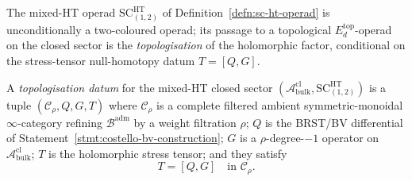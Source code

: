 The mixed-HT operad \(\mathrm{SC}^{\mathrm{HT}}_{(1,2)}\) of
Definition~\ref{defn:sc-ht-operad} is unconditionally a
two-coloured operad; its passage to a topological
\(E_d^{\mathrm{top}}\)-operad on the closed sector is the
\emph{topologisation} of the holomorphic factor, conditional on the
stress-tensor null-homotopy datum \(T=[Q,G]\).

\begin{defn}\label{defn:topologisation-datum}
A \emph{topologisation datum} for the mixed-HT closed sector
\((\mathcal A^{\mathrm{cl}}_{\mathrm{bulk}},
\mathrm{SC}^{\mathrm{HT}}_{(1,2)})\) is a tuple
\((\mathcal C_\rho,Q,G,T)\) where
\(\mathcal C_\rho\) is a complete filtered ambient
symmetric-monoidal \(\infty\)-category refining
\(\mathcal B^{\mathrm{adm}}\) by a weight filtration \(\rho\); \(Q\) is
the BRST/BV differential of
Statement~\ref{stmt:costello-bv-construction}; \(G\) is a
\(\rho\)-degree-\(-1\) operator on
\(\mathcal A^{\mathrm{cl}}_{\mathrm{bulk}}\); \(T\) is the holomorphic
stress tensor; and they satisfy
\begin{equation}\label{eq:stress-tensor-null-homotopy}
  T=[Q,G]\quad\text{in }\mathcal C_\rho.
\end{equation}
\end{defn}

